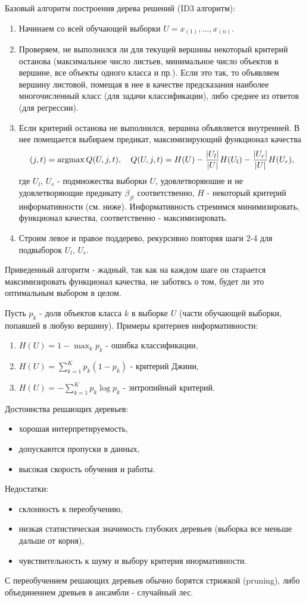 Базовый алгоритм построения дерева решений (ID3 алгоритм):

\begin{enumerate}
    \item Начинаем со всей обучающей выборки $U = x_{(1)}, ..., x_{(n)}$.
    \item Проверяем, не выполнился ли для текущей вершины некоторый критерий останова (максимальное число листьев, минимальное число объектов в вершине, все объекты одного класса и пр.). Если это так, то объявляем вершину листовой, помещая в нее в качестве предсказания наиболее многочисленный класс (для задачи классификации), либо среднее из ответов (для регрессии).
    \item Если критерий останова не выполнился, вершина объявляется внутренней. В нее помещается выбираем предикат, максимизирующий функционал качества
$$
(j,t) = \operatorname*{argmax} Q(U, j, t), \quad Q(U, j, t) = H(U) - \frac{|U_l|}{|U|}H(U_l) - \frac{|U_r|}{|U|}H(U_r),
$$
где $U_l$, $U_r$ - подмножества выборки $U$, удовлетворяюшие и не удовлетворяющие предикату $\beta_{jt}$ соответственно, $H$ - некоторый критерий информативности (см. ниже). Информативность стремимся минимизировать, функционал качества, соответственно - максимизировать.
    \item Строим левое и правое поддерево, рекурсивно повторяя шаги 2-4 для подвыборок $U_l$, $U_r$.
\end{enumerate}

Приведенный алгоритм - жадный, так как на каждом шаге он старается максимизировать функционал качества, не заботясь о том, будет ли это оптимальным выбором в целом.

Пусть $p_k$ - доля объектов класса $k$ в выборке $U$ (части обучающей выборки, попавшей в любую вершину). Примеры критериев информативности:
\begin{enumerate}
    \item $H(U) = 1 - \max_k p_k$ - ошибка классификации,
    \item $H(U) = \sum_{k=1}^Kp_k(1 - p_k)$ - критерий Джини,
    \item $H(U) = -\sum_{k=1}^Kp_k\log p_k$ - энтропийный критерий.
\end{enumerate}
Достоинства решающих деревьев:
\begin{itemize}
    \item хорошая интерпретируемость,
    \item допускаются пропуски в данных,
    \item высокая скорость обучения и работы.
\end{itemize}
Недостатки:
\begin{itemize}
    \item склонность к переобучению,
    \item низкая статистическая значимость глубоких деревьев (выборка все меньше дальше от корня),
    \item чувствительность к шуму и выбору критерия инормативности.
\end{itemize}
С переобучением решающих деревьев обычно борятся стрижкой (pruning), либо объединением древьев в ансамбли - случайный лес.


